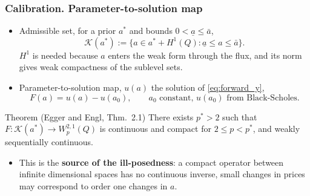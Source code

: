 \begin{frame}
\frametitle{Calibration. Parameter-to-solution map}
\begin{scriptsize}
\begin{itemize}
\item Admissible set, for a prior $a^*$ and bounds $0 < \underline{a} \leq \bar{a}$,
\begin{equation*}
    \mathcal{K}(a^*) := \bigl\{ a \in a^* + H^1(Q) : \underline{a} \le a \le \bar{a} \bigr\}.
\end{equation*}
$H^1$ is needed because $a$ enters the weak form through the flux,
and its norm gives weak compactness of the sublevel sets.

\item Parameter-to-solution map, $u(a)$ the solution of \eqref{eq:forward_y},
\begin{equation*}
    F(a) = u(a) - u(a_0), \qquad a_0 \text{ constant, } u(a_0) \text{ from Black-Scholes}.
\end{equation*}
\end{itemize}

\begin{block}{Theorem (Egger and Engl, Thm.~2.1)}
There exists $p^* > 2$ such that $F\colon \mathcal{K}(a^*) \to W_p^{2,1}(Q)$
is continuous and compact for $2 \le p < p^*$, and weakly sequentially continuous.
\end{block}

\begin{itemize}
\item This is the \textbf{source of the ill-posedness}:
a compact operator between infinite dimensional spaces has no continuous inverse,
small changes in prices may correspond to order one changes in $a$.
\end{itemize}
\end{scriptsize}
\end{frame}

